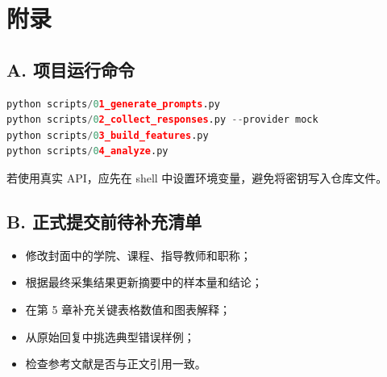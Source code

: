 
\chapter*{附\quad 录}

\section*{A. 项目运行命令}

\begin{lstlisting}[language=Python,caption={项目基础运行命令}]
python scripts/01_generate_prompts.py
python scripts/02_collect_responses.py --provider mock
python scripts/03_build_features.py
python scripts/04_analyze.py
\end{lstlisting}

若使用真实 API，应先在 shell 中设置环境变量，避免将密钥写入仓库文件。

\section*{B. 正式提交前待补充清单}

\begin{itemize}
    \item 修改封面中的学院、课程、指导教师和职称；
    \item 根据最终采集结果更新摘要中的样本量和结论；
    \item 在第 5 章补充关键表格数值和图表解释；
    \item 从原始回复中挑选典型错误样例；
    \item 检查参考文献是否与正文引用一致。
\end{itemize}
